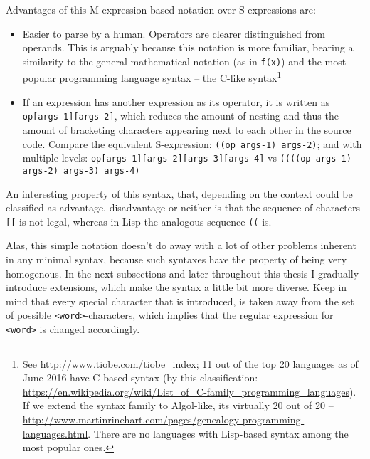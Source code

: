 Advantages of this M-expression-based notation over S-expressions are:
\begin{itemize}
    \item Easier to parse by a human. Operators are clearer distinguished from operands. This is arguably because this notation is more familiar, bearing a similarity to the general mathematical notation (as in \texttt{f(x)}) and the most popular programming language syntax -- the C-like syntax\footnote{See \url{http://www.tiobe.com/tiobe_index}; 11 out of the top 20 languages as of June 2016 have C-based syntax (by this classification: \url{https://en.wikipedia.org/wiki/List_of_C-family_programming_languages}). If we extend the syntax family to Algol-like, its virtually 20 out of 20 -- \url{http://www.martinrinehart.com/pages/genealogy-programming-languages.html}. There are no languages with Lisp-based syntax among the most popular ones.}
    \item If an expression has another expression as its operator, it is written as \texttt{op[args-1][args-2]}, which reduces the amount of nesting and thus the amount of bracketing characters appearing next to each other in the source code. Compare the equivalent S-expression: \texttt{((op args-1) args-2)}; and with multiple levels: \texttt{op[args-1][args-2][args-3][args-4]} vs \texttt{((((op args-1) args-2) args-3) args-4)}
\end{itemize}

An interesting property of this syntax, that, depending on the context could be classified as advantage, disadvantage or neither is that the sequence of characters \texttt{[[} is not legal, whereas in Lisp the analogous sequence \texttt{((} is.

Alas, this simple notation doesn't do away with a lot of other problems inherent in any minimal syntax, because such syntaxes have the property of being very homogenous. In the next subsections and later throughout this thesis I gradually introduce extensions, which make the syntax a little bit more diverse. Keep in mind that every special character that is introduced, is taken away from the set of possible \texttt{<word>}-characters, which implies that the regular expression for \texttt{<word>} is changed accordingly.

